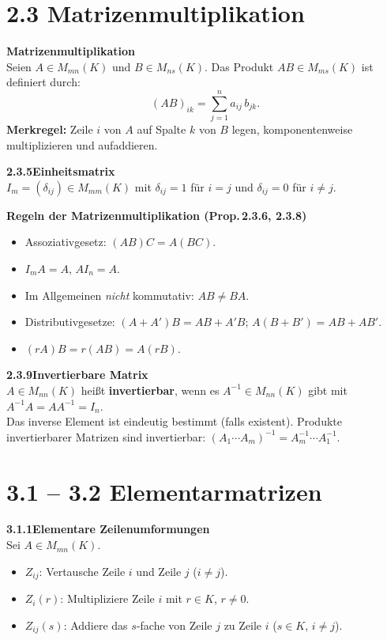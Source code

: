 \documentclass[a4paper,12pt]{article}
\newcommand{\gentry}[3]{%
  \noindent\textbf{#1\quad #2}\nopagebreak\\[0.2em]
  #3\par\smallskip
}
\begin{document}
\section*{2.3 \quad Matrizenmultiplikation}

\gentry{}{Matrizenmultiplikation}{%
  Seien $A \in M_{mn}(K)$ und $B \in M_{ns}(K)$. Das Produkt
  $AB \in M_{ms}(K)$ ist definiert durch:
  \[
    (AB)_{ik} = \sum_{j=1}^{n} a_{ij} \, b_{jk}.
  \]
  \textbf{Merkregel:} Zeile $i$ von $A$ auf Spalte $k$ von $B$ legen,
  komponentenweise multiplizieren und aufaddieren.
}

\gentry{2.3.5}{Einheitsmatrix}{%
  $I_m = (\delta_{ij}) \in M_{mm}(K)$ mit $\delta_{ij} = 1$ für $i = j$
  und $\delta_{ij} = 0$ für $i \neq j$.
}

\gentry{}{Regeln der Matrizenmultiplikation (Prop.\,2.3.6, 2.3.8)}{%
  \begin{itemize}[topsep=2pt,itemsep=1pt]
    \item Assoziativgesetz: $(AB)C = A(BC)$.
    \item $I_m A = A$, \; $A I_n = A$.
    \item Im Allgemeinen \emph{nicht} kommutativ: $AB \neq BA$.
    \item Distributivgesetze: $(A+A')B = AB+A'B$;\; $A(B+B') = AB+AB'$.
    \item $(rA)B = r(AB) = A(rB)$.
  \end{itemize}
}

\gentry{2.3.9}{Invertierbare Matrix}{%
  $A \in M_{nn}(K)$ heißt \textbf{invertierbar}, wenn es
  $A^{-1} \in M_{nn}(K)$ gibt mit $A^{-1}A = AA^{-1} = I_n$.
  \smallskip\\
  Das inverse Element ist eindeutig bestimmt (falls existent).
  Produkte invertierbarer Matrizen sind invertierbar:
  $(A_1 \cdots A_m)^{-1} = A_m^{-1} \cdots A_1^{-1}$.
}

\section*{3.1 -- 3.2 \quad Elementarmatrizen}

\gentry{3.1.1}{Elementare Zeilenumformungen}{%
  Sei $A \in M_{mn}(K)$.
  \begin{itemize}[topsep=2pt,itemsep=1pt]
    \item $Z_{ij}$: Vertausche Zeile $i$ und Zeile $j$ ($i \neq j$).
    \item $Z_i(r)$: Multipliziere Zeile $i$ mit $r \in K$, $r \neq 0$.
    \item $Z_{ij}(s)$: Addiere das $s$-fache von Zeile $j$ zu Zeile $i$
          ($s \in K$, $i \neq j$).
  \end{itemize}
}
\end{document}
